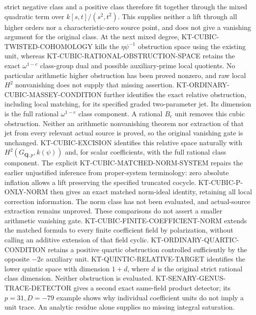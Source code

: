 \documentclass[11pt,a4paper]{article}
\theoremstyle{definition}
\begin{document}
strict negative class and a positive class therefore fit
together through the mixed quadratic term over
$k[s,t]/(s^2,t^2)$. This supplies neither a lift through all
higher orders nor a characteristic-zero source point, and
does not give a vanishing argument for the original class.
At the next mixed degree, KT-CUBIC-TWISTED-COHOMOLOGY kills
the $\eta\psi^{-1}$ obstruction space using the existing unit,
whereas KT-CUBIC-RATIONAL-OBSTRUCTION-SPACE retains the exact
$\omega^{1-e}$ class-group dual and possible auxiliary-prime
local quotients. No particular arithmetic higher obstruction
has been proved nonzero, and raw local $H^2$ nonvanishing
does not supply that missing assertion.
KT-ORDINARY-CUBIC-MASSEY-CONDITION further identifies the exact
relative obstruction, including local matching, for its specified
graded two-parameter jet. Its dimension is the full rational
$\omega^{1-e}$ class component. A rational $B_e$ unit removes
this cubic obstruction. Neither an arithmetic nonvanishing theorem
nor extraction of that jet from every relevant actual source is
proved, so the original vanishing gate is unchanged.
KT-CUBIC-EXCISION identifies this relative space naturally with
$H^2(G_{\mathbf Q,p},k(\psi))$ and, for scalar coefficients,
with the full rational class component. The explicit
KT-CUBIC-MATCHED-NORM-SYSTEM repairs the earlier unjustified
inference from proper-system terminology: zero absolute inflation
allows a lift preserving the specified truncated cocycle.
KT-CUBIC-P-ONLY-NORM then gives an exact matched norm-ideal
identity, retaining all local correction information. The norm
class has not been evaluated, and actual-source extraction remains
unproved. These comparisons do not assert a smaller arithmetic
vanishing gate.
KT-CUBIC-FINITE-COEFFICIENT-NORM extends the matched formula
to every finite coefficient field by polarization, without
calling an additive extension of that field cyclic.
KT-ORDINARY-QUARTIC-CONDITION retains a positive quartic
obstruction controlled sufficiently by the opposite $-2e$
auxiliary unit. KT-QUINTIC-RELATIVE-TARGET identifies the lower
quintic space with dimension $1+d$, where $d$ is the original
strict rational class dimension. Neither obstruction is evaluated.
KT-SENARY-GENUS-TRACE-DETECTOR gives a second exact same-field
product detector; its $p=31,D=-79$ example shows why individual
coefficient units do not imply a unit trace. An analytic residue
alone supplies no missing integral saturation.
\end{document}

